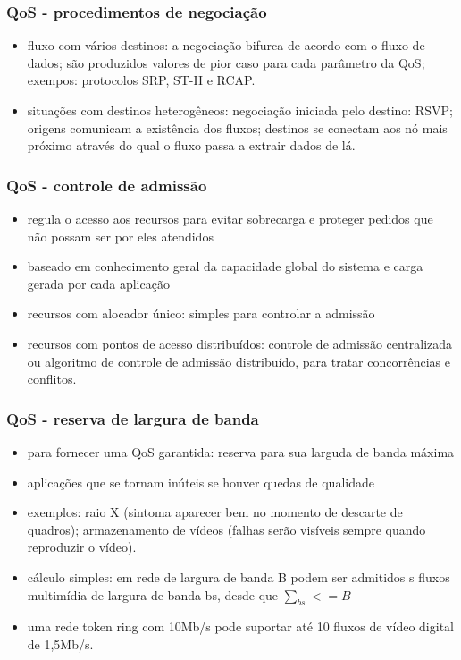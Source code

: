 \documentclass[]{beamer}
\begin{document}
\begin{frame}
  \frametitle{QoS - procedimentos de negociação}
\begin{itemize}
  \item fluxo com vários destinos: a negociação bifurca de acordo
com o fluxo de dados; são produzidos valores de pior caso para cada parâmetro da QoS;
exempos: protocolos SRP, ST-II e RCAP.
  \item situações com destinos heterogêneos: negociação iniciada pelo destino: 
RSVP; origens comunicam a existência
dos fluxos; destinos se conectam aos nó mais próximo através do qual o fluxo passa a extrair
dados de lá.
\end{itemize}
\end{frame}

\begin{frame}
  \frametitle{QoS - controle de admissão}
\begin{itemize}
  \item regula o acesso aos recursos para evitar sobrecarga e proteger pedidos que não possam
ser por eles atendidos
  \item baseado em conhecimento geral da capacidade global do sistema e carga gerada
por cada aplicação
  \item recursos com alocador único: simples para controlar a admissão
  \item recursos com pontos de acesso distribuídos: controle de admissão centralizada
ou algoritmo de controle de admissão distribuído, para tratar concorrências e conflitos.
\end{itemize}
\end{frame}

\begin{frame}
  \frametitle{QoS - reserva de largura de banda}
\begin{itemize}
  \item para fornecer uma QoS garantida: reserva para sua larguda de banda máxima
  \item aplicações que se tornam inúteis se houver quedas de qualidade
  \item exemplos: raio X (sintoma aparecer bem no momento de descarte de quadros); 
armazenamento de vídeos (falhas serão visíveis sempre quando reproduzir o vídeo).
  \item cálculo simples: em rede de largura de banda B podem ser admitidos s fluxos
multimídia de largura de banda bs, desde que $\sum_{bs} <= B$
  \item uma rede token ring com 10Mb/s pode suportar até 10 fluxos de vídeo digital de
1,5Mb/s.
\end{itemize}
\end{frame}
\end{document}
